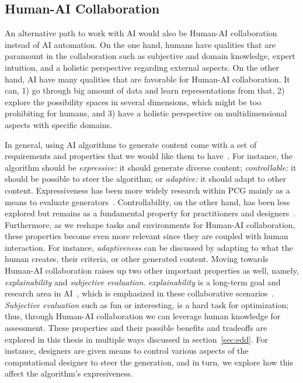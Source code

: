 \subsection{Human-AI Collaboration}

An alternative path to work with AI would also be Human-AI collaboration instead of AI automation. On the one hand, humans have qualities that are paramount in the collaboration such as subjective and domain knowledge, expert intuition, and a holistic perspective regarding external aspects. On the other hand, AI have many qualities that are favorable for Human-AI collaboration. It can, 1) go through big amount of data and learn representations from that, 2) explore the possibility spaces in several dimensions, which might be too prohibiting for humans, and 3) have a holistic perspective on multidimensional aspects with specific domains.

In general, using AI algorithms to generate content come with a set of requirements and properties that we would like them to have~\cite{shaker_procedural_2016}. For instance, the algorithm should be \emph{expressive:} it should generate diverse content; \emph{controllable:} it should be possible to steer the algorithm; or \emph{adaptive:} it should adapt to other content. Expressiveness has been more widely research within PCG mainly as a means to evaluate generators~\cite{smith_expressive_2012,horn_comparative_2014,kreminski_evaluating_2022}. Controllability, on the other hand, has been less explored but remains as a fundamental property for practitioners and designers~\cite{earle_learning_2021,madkour_towards_2022,partlan_design-driven_2021}. Furthermore, as we reshape tasks and environments for Human-AI collaboration, these properties become even more relevant since they are coupled with human interaction. For instance, \emph{adaptiveness} can be discussed by adapting to what the human creates, their criteria, or other generated content. Moving towards Human-AI collaboration raises up two other important properties as well, namely, \emph{explainability} and \emph{subjective evaluation}. \emph{explainability} is a long-term goal and research area in AI~\cite{doshi-velez_considerations_2018,holmberg_role_2021}, which is emphasized in these collaborative scenarios~\cite{zhu_explainable_2018}. \emph{Subjective evaluation} such as fun or interesting, is a hard task for optimization; thus, through Human-AI collaboration we can leverage human knowledge for assessment.  These properties and their possible benefits and tradeoffs are explored in this thesis in multiple ways discussed in section~\ref{sec:edd}. For instance, designers are given means to control various aspects of the computational designer to steer the generation, and in turn, we explore how this affect the algorithm's expresiveness.

